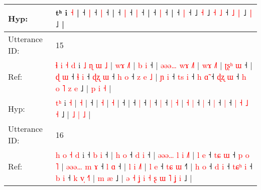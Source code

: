 \documentclass[10pt]{article}
\DeclareRobustCommand{\hl}[1]{{\textcolor{red}{#1}}}
\begin{document}
\begin{longtable}{ll}
 \\
Hyp: & tʰ i \hl{}\hl{˧} |\hl{}\hl{}\hl{}\hl{}\hl{}\hl{}\hl{}\hl{} ˧\hl{}\hl{}\hl{}\hl{} \hl{|} ˧\hl{}\hl{} \hl{|} ˧ |\hl{}\hl{}\hl{}\hl{} ˧\hl{}\hl{} \hl{|} ˧\hl{}\hl{} \hl{|} ˧ |\hl{}\hl{}\hl{}\hl{} ˧\hl{}\hl{} \hl{|} ˧\hl{} |\hl{}\hl{}\hl{}\hl{} ˧\hl{}\hl{}\hl{} \hl{|} ˧\hl{}\hl{}\hl{}\hl{}\hl{}\hl{}\hl{}\hl{}\hl{}\hl{} ˩\hl{}\hl{}\hl{}\hl{} \hl{˧} ˩\hl{}\hl{}\hl{}\hl{}\hl{}\hl{}\hl{} \hl{˧} \hl{˩} ˧ \hl{˩} \hl{|} ˩\hl{}\hl{}\hl{} \hl{|} ˩ |
 \\
\midrule
Utterance ID: & 15 \\
Ref: & \hl{ɬ}\hl{ }\hl{i}\hl{ }\hl{˧}\hl{ }\hl{d} i\hl{ }\hl{˩}\hl{ }\hl{ɳ}\hl{ }\hl{ɯ} \hl{˩} |\hl{ }\hl{w}\hl{ɤ} \hl{˩}\hl{˥} |\hl{ }\hl{b}\hl{ }\hl{i} ˧ |\hl{ }\hl{ə}\hl{ə}\hl{ə}\hl{…}\hl{ }\hl{w}\hl{ɤ} \hl{˩}\hl{˥} |\hl{ }\hl{w}\hl{ɤ} \hl{˩}\hl{˥} |\hl{ }\hl{ʈ}\hl{ʂ}\hl{ʰ}\hl{ }\hl{ɯ} ˧ |\hl{ }\hl{ɖ}\hl{ }\hl{ɯ} ˧\hl{ }\hl{ɬ} \hl{i} ˧\hl{ }\hl{ɖ}\hl{ʐ} \hl{ɯ} ˧\hl{ }\hl{h} \hl{o} ˧\hl{ }\hl{z} \hl{e} \hl{˩} | \hl{ɲ} \hl{i} ˧\hl{ }\hl{t}\hl{s} \hl{i} ˧\hl{ }\hl{h} \hl{ɑ}\hl{̃} ˧\hl{ }\hl{ɖ}\hl{ʐ} \hl{ɯ} ˧\hl{ }\hl{h} \hl{o} \hl{˥} \hl{z} \hl{e} ˩ | \hl{p} \hl{i} \hl{˧} |
 \\
Hyp: & \hl{}\hl{}\hl{}\hl{}\hl{}\hl{t}\hl{ʰ} i\hl{}\hl{}\hl{}\hl{}\hl{}\hl{} \hl{˧} |\hl{}\hl{}\hl{} \hl{}\hl{˧} |\hl{}\hl{}\hl{}\hl{} ˧ |\hl{}\hl{}\hl{}\hl{}\hl{}\hl{}\hl{}\hl{} \hl{}\hl{˧} |\hl{}\hl{}\hl{} \hl{}\hl{˧} |\hl{}\hl{}\hl{}\hl{}\hl{}\hl{} ˧ |\hl{}\hl{}\hl{}\hl{} ˧\hl{}\hl{} \hl{|} ˧\hl{}\hl{}\hl{} \hl{|} ˧\hl{}\hl{} \hl{|} ˧\hl{}\hl{} \hl{|} \hl{˧} | \hl{˧} \hl{|} ˧\hl{}\hl{}\hl{} \hl{|} ˧\hl{}\hl{} \hl{}\hl{|} ˧\hl{}\hl{}\hl{} \hl{|} ˧\hl{}\hl{} \hl{|} \hl{˧} \hl{˩} \hl{˧} ˩ | \hl{˩} \hl{|} \hl{˩} |
 \\
\midrule
Utterance ID: & 16 \\
Ref: & \hl{h}\hl{ }\hl{o}\hl{ }\hl{˧}\hl{ }\hl{d} i ˧\hl{ }\hl{b} \hl{i} ˧ |\hl{ }\hl{h}\hl{ }\hl{o} ˧\hl{ }\hl{d} \hl{i} ˧ |\hl{ }\hl{ə}\hl{ə}\hl{ə}\hl{…}\hl{ }\hl{l}\hl{ }\hl{i} \hl{˩}\hl{˥} |\hl{ }\hl{l}\hl{ }\hl{e} ˧\hl{ }\hl{t}\hl{ɕ} \hl{ɯ} ˧\hl{ }\hl{p}\hl{ }\hl{o}\hl{ }\hl{˥} |\hl{ }\hl{ə}\hl{ə}\hl{ə}\hl{…}\hl{ }\hl{m}\hl{ }\hl{ɤ} ˧\hl{ }\hl{l} \hl{ɑ} ˧ |\hl{ }\hl{l}\hl{ }\hl{i} \hl{˩}\hl{˥} |\hl{ }\hl{l}\hl{ }\hl{e} ˧\hl{ }\hl{t}\hl{ɕ} \hl{ɯ} ˧\hl{˥} |\hl{ }\hl{h}\hl{ }\hl{o} ˧\hl{ }\hl{d} \hl{i} ˧\hl{ }\hl{t}\hl{ɕ}\hl{ʰ} \hl{i} ˧\hl{ }\hl{b} \hl{i} ˧\hl{ }\hl{k}\hl{ }\hl{v}\hl{̩} \hl{˧}\hl{˥} |\hl{ }\hl{m}\hl{ }\hl{æ} ˩ |\hl{ }\hl{ə}\hl{ }\hl{˧}\hl{ }\hl{ʝ}\hl{ }\hl{i}\hl{ }\hl{˧}\hl{ }\hl{ʂ}\hl{ }\hl{ɯ}\hl{ }\hl{˥}\hl{ }\hl{ʝ}\hl{ }\hl{i} ˩ |

\end{longtable}
\end{document}
